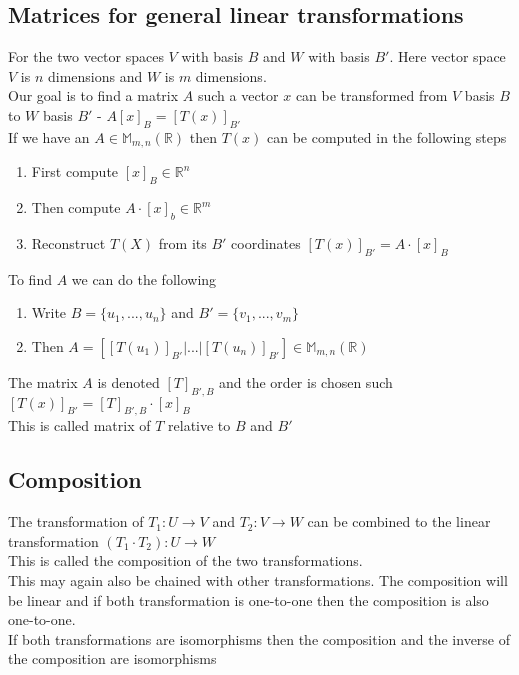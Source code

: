\documentclass[12pt, a4paper]{article}
\begin{document}
		\subsection{Matrices for general linear transformations}
			For the two vector spaces $V$ with basis $B$ and $W$ with basis $B'$. Here vector space $V$ is $n$ dimensions and $W$ is $m$ dimensions.\\ 
			Our goal is to find a matrix $A$ such a vector $x$ can be transformed from $V$ basis $B$ to $W$ basis $B'$ - $A[x]_B=[T(x)]_{B'}$\\
			If we have an $A\in\mathbb{M}_{m,n}(\mathbb{R})$ then $T(x)$ can be computed in the following steps
			\begin{enumerate}
				\item First compute $[x]_B\in \mathbb{R}^n$
				\item Then compute $A\cdot [x]_b\in \mathbb{R}^m$
				\item Reconstruct $T(X)$ from its $B'$ coordinates $[T(x)]_{B'}=A\cdot [x]_B$
			\end{enumerate}
			To find $A$ we can do the following
			\begin{enumerate}
				\item Write $B=\{u_1,...,u_n\}$ and $B'=\{v_1,...,v_m\}$
				\item Then $A=[[T(u_1)]_{B'}|...|[T(u_n)]_{B'}]\in\mathbb{M}_{m,n}(\mathbb{R})$
			\end{enumerate}
			The matrix $A$ is denoted $[T]_{B',B}$ and the order is chosen such $[T(x)]_{B'}=[T]_{B',B}\cdot [x]_B$\\
			This is called matrix of $T$ relative to $B$ and $B'$\\
			
		\subsection{Composition}
			The transformation of $T_1:U\rightarrow V$ and $T_2:V\rightarrow W$ can be combined to the linear transformation $(T_1\cdot T_2):U\rightarrow W$\\
			This is called the composition of the two transformations.\\
			This may again also be chained with other transformations.
			The composition will be linear and if both transformation is one-to-one then the composition is also one-to-one.\\
			If both transformations are isomorphisms then the composition and the inverse of the composition are isomorphisms\\
\end{document}
